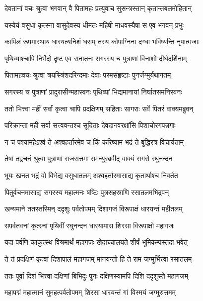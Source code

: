 
\twolineshloka
{देवतानां वचः श्रुत्वा भगवान् वै पितामहः}
{प्रत्युवाच सुसन्त्रस्तान् कृतान्तबलमोहितान्} %

\twolineshloka
{यस्येयं वसुधा कृत्स्ना वासुदेवस्य धीमतः}
{महिषी माधवस्यैषा स एव भगवन् प्रभुः} %

\twolineshloka
{कापिलं रूपमास्थाय धारयत्यनिशं धराम्}
{तस्य कोपाग्निना दग्धा भविष्यन्ति नृपात्मजाः} %

\twolineshloka
{पृथिव्याश्चापि निर्भेदो दृष्ट एव सनातनः}
{सगरस्य च पुत्राणां विनाशो दीर्घदर्शिनाम्} %

\twolineshloka
{पितामहवचः श्रुत्वा त्रयस्त्रिंशदरिन्दमाः}
{देवाः परमसंहृष्टाः पुनर्जग्मुर्यथागतम्} %

\twolineshloka
{सगरस्य च पुत्राणां प्रादुरासीन्महास्वनः}
{पृथिव्यां भिद्यमानायां निर्घातसमनिस्वनः} %

\twolineshloka
{ततो भित्त्वा महीं सर्वां कृत्वा चापि प्रदक्षिणम्}
{सहिताः सागराः सर्वे पितरं वाक्यमब्रुवन्} %

\twolineshloka
{परिक्रान्ता मही सर्वा सत्त्ववन्तश्च सूदिताः}
{देवदानवरक्षांसि पिशाचोरगपन्नगाः} %

\twolineshloka
{न च पश्यामहेऽश्वं ते अश्वहर्तारमेव च}
{किं करिष्याम भद्रं ते बुद्धिरत्र विचार्यताम्} %

\twolineshloka
{तेषां तद्वचनं श्रुत्वा पुत्राणां राजसत्तमः}
{समन्युरब्रवीद् वाक्यं सगरो रघुनन्दन} %

\twolineshloka
{भूयः खनत भद्रं वो विभेद्य वसुधातलम्}
{अश्वहर्तारमासाद्य कृतार्थाश्च निवर्तत} %

\twolineshloka
{पितुर्वचनमासाद्य सगरस्य महात्मनः}
{षष्टिः पुत्रसहस्राणि रसातलमभिद्रवन्} %

\twolineshloka
{खन्यमाने ततस्तस्मिन् ददृशुः पर्वतोपमम्}
{दिशागजं विरूपाक्षं धारयन्तं महीतलम्} %

\twolineshloka
{सपर्वतवनां कृत्स्नां पृथिवीं रघुनन्दन}
{धारयामास शिरसा विरूपाक्षो महागजः} %

\twolineshloka
{यदा पर्वणि काकुत्स्थ विश्रमार्थं महागजः}
{खेदाच्चालयते शीर्षं भूमिकम्पस्तदा भवेत्} %

\twolineshloka
{ते तं प्रदक्षिणं कृत्वा दिशापालं महागजम्}
{मानयन्तो हि ते राम जग्मुर्भित्त्वा रसातलम्} %

\twolineshloka
{ततः पूर्वां दिशं भित्त्वा दक्षिणां बिभिदुः पुनः}
{दक्षिणस्यामपि दिशि ददृशुस्ते महागजम्} %

\twolineshloka
{महापद्मं महात्मानं सुमहत्पर्वतोपमम्}
{शिरसा धारयन्तं गां विस्मयं जग्मुरुत्तमम्} %


